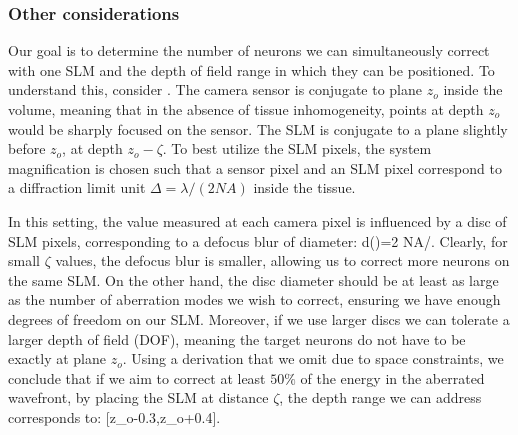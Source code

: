 
\subsubsection{Other considerations}\label{sec:otherconsiderations}
Our goal is to determine the number of neurons we can simultaneously correct with one SLM and the depth of field range in which they can be positioned. To understand this, consider . The camera sensor is conjugate to plane $z_o$ inside the volume, meaning that in the absence of tissue inhomogeneity, points at depth $z_o$ would be sharply focused on the sensor. The SLM is conjugate to a plane slightly before  $z_o$, at depth $z_o-\zeta$. 
To best utilize the SLM pixels, the system magnification is chosen such that a sensor pixel and an SLM pixel correspond to a diffraction limit unit  $\Delta=\lambda/(2NA)$ inside the tissue.
 
 In this setting, the value measured at each camera pixel is influenced by a disc of SLM pixels, corresponding to a defocus blur of diameter:
 \BE\label{eq:defocus-diameter}
 d(\zeta)=2 NA\cdot \zeta/\Delta.
 \EE  
 Clearly, for small  $\zeta$ values, the defocus blur is smaller, allowing us to  correct more neurons on the same SLM. On the other hand, the disc diameter should be at least as large as the number of aberration modes we wish to correct, ensuring we have enough degrees of freedom on our SLM. Moreover, if we use larger discs we can   tolerate a larger depth of field (DOF), meaning the target neurons do not have to be exactly at plane  $z_o$.
 Using a derivation that we omit due to space constraints, we conclude that if we aim to correct at least $50\%$ of the energy in the aberrated wavefront, by placing the SLM at distance $\zeta$, the depth range we can address corresponds to:
 \BE \label{eq:dof-slm-d} [z_o-0.3\zeta,z_o+0.4\zeta].\EE
 
